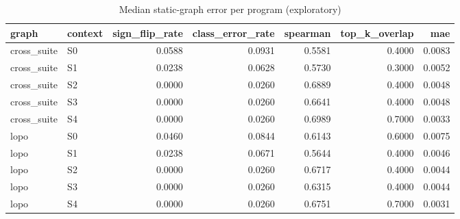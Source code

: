 \begin{table}[t]
\centering
\caption{Median static-graph error per program (exploratory)}
\label{tab:v3-1-static-graph-error}
\begin{tabular}{llrrrrr}
\toprule
graph & context & sign\_flip\_rate & class\_error\_rate & spearman & top\_k\_overlap & mae \\
\midrule
cross\_suite & S0 & 0.0588 & 0.0931 & 0.5581 & 0.4000 & 0.0083 \\
cross\_suite & S1 & 0.0238 & 0.0628 & 0.5730 & 0.3000 & 0.0052 \\
cross\_suite & S2 & 0.0000 & 0.0260 & 0.6889 & 0.4000 & 0.0048 \\
cross\_suite & S3 & 0.0000 & 0.0260 & 0.6641 & 0.4000 & 0.0048 \\
cross\_suite & S4 & 0.0000 & 0.0260 & 0.6989 & 0.7000 & 0.0033 \\
lopo & S0 & 0.0460 & 0.0844 & 0.6143 & 0.6000 & 0.0075 \\
lopo & S1 & 0.0238 & 0.0671 & 0.5644 & 0.4000 & 0.0046 \\
lopo & S2 & 0.0000 & 0.0260 & 0.6717 & 0.4000 & 0.0044 \\
lopo & S3 & 0.0000 & 0.0260 & 0.6315 & 0.4000 & 0.0044 \\
lopo & S4 & 0.0000 & 0.0260 & 0.6751 & 0.7000 & 0.0031 \\
\bottomrule
\end{tabular}
\end{table}

